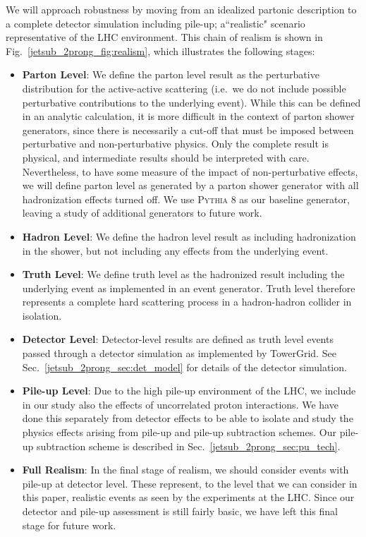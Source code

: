 \documentclass[11pt]{cernrep}
\begin{document}
We will approach robustness by moving from an idealized partonic description to a complete detector simulation including pile-up; a``realistic" scenario representative of the LHC environment.
%
This chain of realism is shown in Fig.~\ref{jetsub_2prong_fig:realism}, which illustrates the following stages:
%
\begin{itemize}
\item {\bf Parton Level}: We define the parton level result as the
  perturbative distribution for the active-active scattering (i.e.\ we
  do not include possible perturbative contributions to the underlying
  event).
  While this can be defined in an analytic calculation, it is
  more difficult in the context of parton shower generators, since
  there is necessarily a cut-off that must be imposed between
  perturbative and non-perturbative physics.
  Only the complete result
  is physical, and intermediate results should be interpreted with
  care.
  Nevertheless, to have some measure of the impact of
  non-perturbative effects, we will define parton level as generated
  by a parton shower generator with all hadronization effects turned
  off.
  We use \textsc{Pythia 8} \cite{Sjostrand:2006za,Sjostrand:2007gs} as our baseline generator, leaving a study of additional generators to future work.
%
\item {\bf Hadron Level}: We define the hadron level result as including hadronization in the shower, but not including any effects from the underlying event.
%
\item {\bf Truth Level}:  We define truth level as the hadronized result including the underlying event as implemented in an event generator.
%
Truth level therefore represents a complete hard scattering process in a hadron-hadron collider in isolation.
%
%
\item {\bf Detector Level}: Detector-level results are defined as truth level events passed through a detector simulation as implemented by TowerGrid.  See Sec.~\ref{jetsub_2prong_sec:det_model} for details of the detector simulation.
%
\item {\bf Pile-up Level}: Due to the high pile-up environment of the LHC, we include in our study also the effects of uncorrelated proton interactions. We have done this separately from detector effects to be able to isolate and study the physics effects arising from pile-up and pile-up subtraction schemes. Our pile-up subtraction scheme is described in Sec.~\ref{jetsub_2prong_sec:pu_tech}.
%
\item {\bf Full Realism}: In the final stage of realism, we should consider events with pile-up at detector
  level.
  These represent, to the level that we can consider in this
  paper, realistic events as seen by the experiments at the
  LHC.
  Since our detector and pile-up assessment is still fairly basic, we
  have left this final stage for future work.
\end{itemize}
\end{document}
